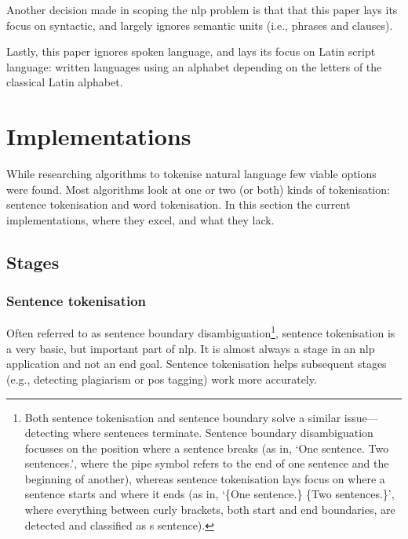 \begin{enumerate}
Another decision made in scoping the \gls{nlp} problem is that that this
paper lays its focus on syntactic, and largely ignores semantic units
(i.e., phrases and clauses).

Lastly, this paper ignores spoken language, and lays its focus on Latin
script language: written languages using an alphabet depending on the
letters of the classical Latin alphabet.

\section{Implementations}\label{implementations}

While researching algorithms to tokenise natural language few viable
options were found. Most algorithms look at one or two (or both) kinds
of tokenisation: sentence tokenisation and word tokenisation. In this
section the current implementations, where they excel, and what they
lack.

\subsection{Stages}\label{stages}

\subsubsection{Sentence tokenisation}\label{sentence-tokenisation}

Often referred to as sentence boundary disambiguation\footnote{Both
  sentence tokenisation and sentence boundary solve a similar
  issue---detecting where sentences terminate. Sentence boundary
  disambiguation focusses on the position where a sentence breaks (as
  in, `One sentence.\textbar{} Two sentences.\textbar{}', where the pipe
  symbol refers to the end of one sentence and the beginning of
  another), whereas sentence tokenisation lays focus on where a sentence
  starts and where it ends (as in, `\{One sentence.\} \{Two
  sentences.\}', where everything between curly brackets, both start and
  end boundaries, are detected and classified as s sentence).}, sentence
tokenisation is a very basic, but important part of \gls{nlp}. It is
almost always a stage in an \gls{nlp} application and not an end goal.
Sentence tokenisation helps subsequent stages (e.g., detecting
plagiarism or \gls{pos} tagging) work more accurately.


\end{enumerate}
